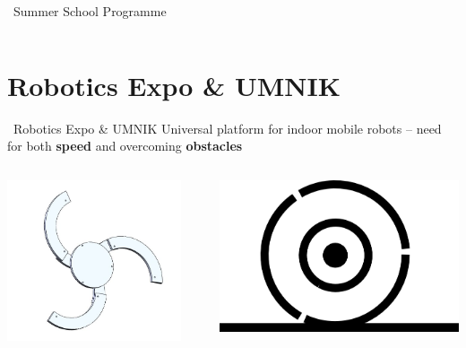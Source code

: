 \documentclass{beamer}
\begin{document}
\begin{frame}{\quad \quad ~Summer School Programme}
\begin{columns}
\begin{column}{0.59\textwidth}
\end{column}
\end{columns}
\end{frame}



\section{Robotics Expo \& UMNIK }
\begin{frame}{\quad \quad ~Robotics Expo \& UMNIK}
\centering 
Universal platform for indoor mobile robots -- \newline{}
need for both \textbf{speed} and overcoming \textbf{obstacles}
\newline{}
\begin{columns}
\begin{column}{0.49\textwidth}
\includegraphics[width=0.9\textwidth]{Pictures/wheel}
\end{column}
\begin{column}{0.49\textwidth}
\includegraphics[height=0.5\textwidth]{Pictures/wheel_closed}

\end{column}
\end{columns}
\end{frame}
\end{document}
